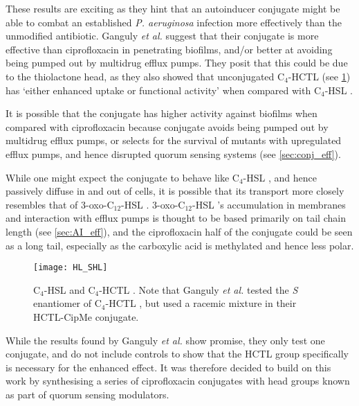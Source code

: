 These results are exciting as they hint that an autoinducer conjugate might be able to combat an established \textit{P. aeruginosa} infection more effectively than the unmodified antibiotic. 
Ganguly \textit{et al.} suggest that their conjugate is more effective than ciprofloxacin in penetrating biofilms, and/or better at avoiding being pumped out by multidrug efflux pumps. They posit that this could be due to the thiolactone head, as they also showed that unconjugated C$_4$-HCTL  (see \ref{fgr:HL_SHL}) has `either enhanced uptake or functional activity' when compared with C$_4$-HSL . 

It is possible that the conjugate  has higher activity against biofilms when compared with ciprofloxacin  because conjugate  avoids being pumped out by multidrug efflux pumps, or selects for the survival of mutants with upregulated efflux pumps, and hence disrupted quorum sensing systems (see \ref{sec:conj_eff}).

While one might expect the conjugate  to behave like C$_4$-HSL , and hence passively diffuse in and out of cells, it is possible that its transport more closely resembles that of 3-oxo-C$_{12}$-HSL . 3-oxo-C$_{12}$-HSL 's accumulation in membranes and interaction with efflux pumps is thought to be based primarily on tail chain length (see \ref{sec:AI_eff}), and the ciprofloxacin half of the conjugate  could be seen as a long tail, especially as the carboxylic acid is methylated and hence less polar.

\begin{figure}[H]
	\begin{center}
		\texttt{[image: HL\_SHL]}
		\caption{
		C$_4$-HSL  and C$_4$-HCTL . Note that Ganguly \textit{et al.} tested the \textit{S} enantiomer of C$_4$-HCTL , but used a racemic mixture in their HCTL-CipMe conjugate. %
		\label{fgr:HL_SHL}}
	\end{center}
\end{figure}

While the results found by Ganguly \textit{et al.} show promise, they only test one conjugate, and do not include controls to show that the HCTL group specifically is necessary for the enhanced effect.
It was therefore decided to build on this work by synthesising a series of ciprofloxacin conjugates with head groups known as part of quorum sensing modulators\cite{Galloway2011,Hodgkinson2012a}.


